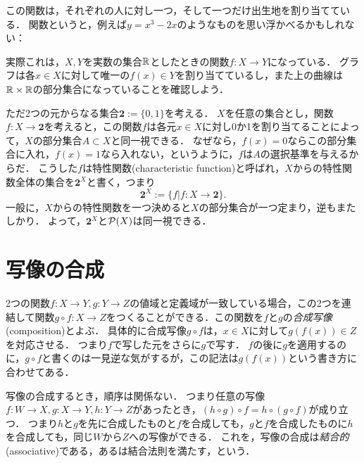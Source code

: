 \documentclass[11pt,a4paper]{jsarticle} %
\begin{document}
この関数は，それぞれの人に対し一つ，そして一つだけ出生地を割り当てている．
関数というと，例えば$y = x^3-2x$のようなものを思い浮かべるかもしれない：
\begin{figure}[h]
\centering
{} 
\end{figure}

実際これは，$X, Y$を実数の集合$\mathbb{R}$としたときの関数$f:X \to Y$になっている．
グラフは各$x \in X$に対して唯一の$f(x) \in Y$を割り当てているし，また上の曲線は$\mathbb{R} \times \mathbb{R}$の部分集合になっていることを確認しよう．


\begin{develop}
ただ2つの元からなる集合$\mathbf{2} := \{0, 1\}$を考える．
$X$を任意の集合とし，関数$f:X \to \mathbf{2}$を考えると，この関数$f$は各元$x \in X$に対し0か1を割り当てることによって，$X$の部分集合$A \subset X$と同一視できる．
なぜなら，$f(x)=0$ならこの部分集合に入れ，$f(x)=1$なら入れない，というように，$f$は$A$の選択基準を与えるからだ．
こうした$f$は特性関数(characteristic function)と呼ばれ，$X$からの特性関数全体の集合を$\mathbf{2}^X$と書く，つまり
\[
 \mathbf{2}^X := \{ f|f:X \to \mathbf{2}\}.
\]
一般に，$X$からの特性関数を一つ決めると$X$の部分集合が一つ定まり，逆もまたしかり．
よって，$\mathbf{2}^X$と$\mathcal{P}(X)$は同一視できる．
\end{develop}


\section{写像の合成}
2つの関数$f:X \to Y, g:Y \to Z$の値域と定義域が一致している場合，この2つを連結して関数$g \circ f:X \to Z$をつくることができる．この関数を$f$と$g$の\emph{合成写像}(composition)とよぶ．
具体的に合成写像$g \circ f$は，$x \in X$に対して$g(f(x)) \in Z$を対応させる．
つまり$f$で写した元をさらに$g$で写す．
$f$の後に$g$を適用するのに，$g \circ f$と書くのは一見逆な気がするが，この記法は$g(f(x))$という書き方に合わせてある．

写像の合成するとき，順序は関係ない．
つまり任意の写像$f:W \to X, g:X \to Y, h:Y \to Z$があったとき，$(h \circ g) \circ f = h \circ (g \circ f)$が成り立つ．
つまり$h$と$g$を先に合成したものと$f$を合成しても，$g$と$f$を合成したものに$h$を合成しても，同じ$W$から$Z$への写像ができる．
これを，写像の合成は\emph{結合的}(associative)である，あるは結合法則を満たす，という．
\end{document}
